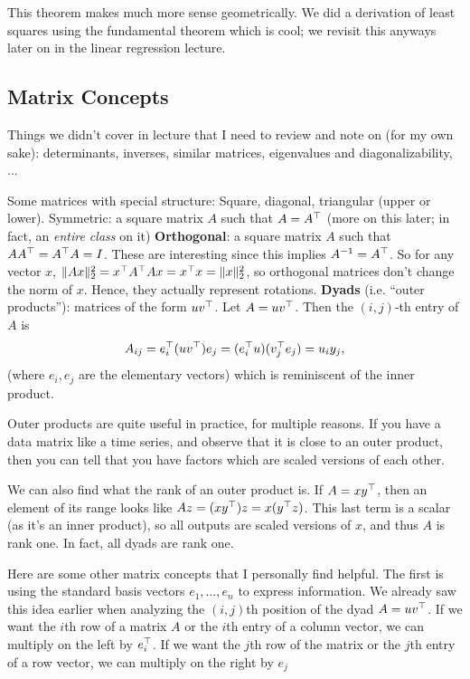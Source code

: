 \documentclass[11 pt]{scrartcl}
\begin{document}
This theorem makes much more sense geometrically. 
We did a derivation of least squares using the fundamental theorem which is cool; we revisit this anyways later on in the linear regression lecture.

\subsection{Matrix Concepts}
Things we didn't cover in lecture that I need to review and note on (for my own sake): determinants, inverses, similar matrices, eigenvalues and diagonalizability, ... 

Some matrices with special structure: 
\itemnum
    \ii Square, diagonal, triangular (upper or lower). 
    \ii Symmetric: a square matrix $A$ such that $A = A^\top$ (more on this later; in fact, an \emph{entire class} on it)
    \ii \textbf{Orthogonal}: a square matrix $A$ such that $AA^\top = A^\top A = I$. 
    These are interesting since this implies $A^{-1} = A^\top$. 
    So for any vector $x$, $\|Ax\|_2^2 = x^\top A^\top Ax = x^\top x = \|x\|_2^2$, so orthogonal matrices don't change the norm of $x$. 
    Hence, they actually represent rotations. 
    \ii \textbf{Dyads} (i.e. ``outer products''): matrices of the form $uv^\top$. 
    Let $A = uv^\top$. Then the $(i,j)$-th entry of $A$ is 
    \[ A_{ij} = e_i^\top(uv^\top) e_j = (e_i^\top u)(v_j^\top e_j) = u_iy_j,\] 
    (where $e_i, e_j$ are the elementary vectors) which is reminiscent of the inner product. 
\itemend

Outer products are quite useful in practice, for multiple reasons. 
If you have a data matrix like a time series, and observe that it is close to an outer product, then you can tell that you have factors which are scaled versions of each other. 

We can also find what the rank of an outer product is. 
If $A = xy^\top$, then an element of its range looks like $Az = (xy^\top)z = x(y^\top z)$. 
This last term is a scalar (as it's an inner product), so all outputs are scaled versions of $x$, and thus $A$ is rank one. 
In fact, all dyads are rank one. 

Here are some other matrix concepts that I personally find helpful.
The first is using the standard basis vectors $e_1, \dots, e_n$ to express information. 
We already saw this idea earlier when analyzing the $(i,j)$th position of the dyad $A = uv^\top$. 
If we want the $i$th row of a matrix $A$ or the $i$th entry of a column vector, we can multiply on the left by $e_i^\top$.
If we want the $j$th row of the matrix or the $j$th entry of a row vector, we can multiply on the right by $e_j$
\end{document}
